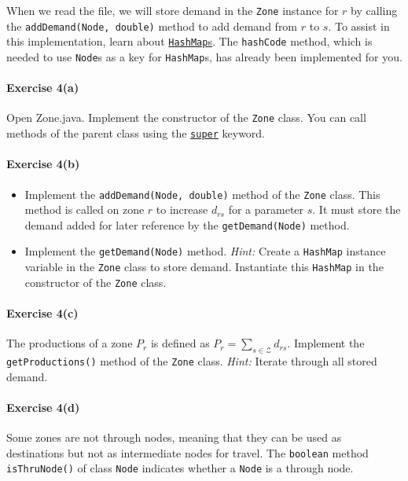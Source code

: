 \documentclass[11pt]{article}
\newcommand{\Z}{\mathcal{Z}}
\begin{document}
When we read the file, we will store demand in the \texttt{Zone} instance for $r$ by calling the \texttt{addDemand(Node, double)} method to add demand from $r$ to $s$.
To assist in this implementation, learn about \href{https://www.w3schools.com/java/java_hashmap.asp}{\texttt{HashMap}s}. The \texttt{hashCode} method, which is needed to use \texttt{Node}s as a key for \texttt{HashMap}s, has already been implemented for you.  
	
	
\paragraph*{Exercise 4(a)} Open Zone.java. Implement the constructor of the \texttt{Zone} class. You can call methods of the parent class using the \href{https://www.w3schools.com/java/ref_keyword_super.asp}{\texttt{super}} keyword.

\paragraph*{Exercise 4(b)} 
\begin{itemize}
\item Implement the \texttt{addDemand(Node, double)} method of the \texttt{Zone} class. This method is called on zone $r$ to increase $d_{rs}$ for a parameter $s$. It must store the demand added for later reference by the \texttt{getDemand(Node)} method.

 \item Implement the \texttt{getDemand(Node)} method. \textit{Hint: } Create a \texttt{HashMap} instance variable in the \texttt{Zone} class to store demand. Instantiate this \texttt{HashMap} in the constructor of the \texttt{Zone} class. 
\end{itemize}

\paragraph*{Exercise 4(c)} The productions of a zone $P_r$ is defined as $P_r=\sum\limits_{s\in\Z}d_{rs}$. Implement the \texttt{getProductions()} method of the \texttt{Zone} class. \textit{Hint:} Iterate through all stored demand.


\paragraph*{Exercise 4(d)} Some zones are not through nodes, meaning that they can be used as destinations but not as intermediate nodes for travel. The \texttt{boolean} method \texttt{isThruNode()} of class \texttt{Node} indicates whether a \texttt{Node} is a through node. 
\end{document}

